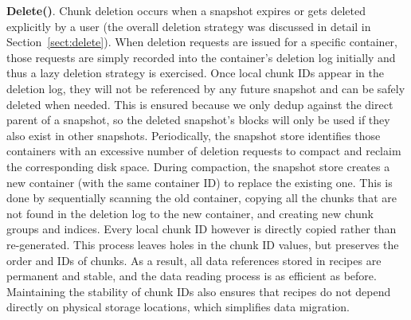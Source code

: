 \noindent\textbf{Delete()}.
Chunk deletion occurs when a snapshot expires or gets deleted explicitly by a user (the overall deletion strategy was discussed in detail in Section~\ref{sect:delete}).
When deletion requests are issued for a specific container,
those requests are simply recorded into the  container's deletion log initially and thus  a lazy
deletion strategy is exercised.
Once local chunk IDs appear in
the deletion log, they will not be referenced by any future snapshot and can be safely deleted when needed. 
This is ensured because we only dedup against the direct parent of a snapshot, so the deleted snapshot's blocks
will only be used if they also exist in other snapshots.
Periodically, the snapshot  store identifies those containers with an excessive
number of deletion requests to  compact and  reclaim the corresponding disk space. 
During compaction, the snapshot store creates a new container (with the same container ID) to replace the 
existing one. This is done by sequentially scanning the old container, copying all the chunks that are not 
found in the deletion log to the new container, and creating new chunk groups and indices. 
Every local chunk ID however is directly copied rather than re-generated. This
process leaves holes in the chunk ID values, but preserves the order and IDs of chunks.
As a result, all data references stored 
in recipes are permanent and stable, and the data reading process
is as efficient as before. Maintaining the stability of chunk IDs also ensures that recipes do not
depend directly on physical storage locations, which simplifies data migration.


